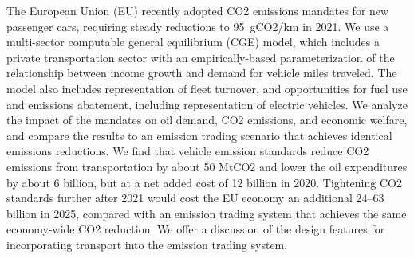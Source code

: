 The European Union (EU) recently adopted CO2 emissions mandates for new passenger cars, requiring steady reductions to 95 gCO2/km in 2021. We use a multi-sector computable general equilibrium (CGE) model, which includes a private transportation sector with an empirically-based parameterization of the relationship between income growth and demand for vehicle miles traveled. The model also includes representation of fleet turnover, and opportunities for fuel use and emissions abatement, including representation of electric vehicles. We analyze the impact of the mandates on oil demand, CO2 emissions, and economic welfare, and compare the results to an emission trading scenario that achieves identical emissions reductions. We find that vehicle emission standards reduce CO2 emissions from transportation by about 50 MtCO2 and lower the oil expenditures by about {\texteuro}6 billion, but at a net added cost of {\texteuro}12 billion in 2020. Tightening CO2 standards further after 2021 would cost the EU economy an additional {\texteuro}24--63 billion in 2025, compared with an emission trading system that achieves the same economy-wide CO2 reduction. We offer a discussion of the design features for incorporating transport into the emission trading system.